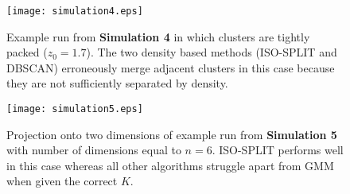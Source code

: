 \documentclass[10pt]{article}
\begin{document}
\begin{figure}
\begin{center}
\texttt{[image: simulation4.eps]}
\end{center}
\caption{
Example run from \textbf{Simulation 4} in which clusters are tightly packed ($z_0=1.7$). The two density based methods (ISO-SPLIT and DBSCAN) erroneously merge adjacent clusters in this case because they are not sufficiently separated by density.
}
\label{fig:simulation4}
\end{figure}

\begin{figure}
\begin{center}
\texttt{[image: simulation5.eps]}
\end{center}
\caption{
Projection onto two dimensions of example run from \textbf{Simulation 5} with number of dimensions equal to $n=6$. ISO-SPLIT performs well in this case whereas all other algorithms struggle apart from GMM when given the correct $K$.
}
\label{fig:simulation5}
\end{figure}

\newcommand{\multicell}[2][c]{%
  \begin{tabular}[#1]{@{}l@{}}#2\end{tabular}}
\end{document}
